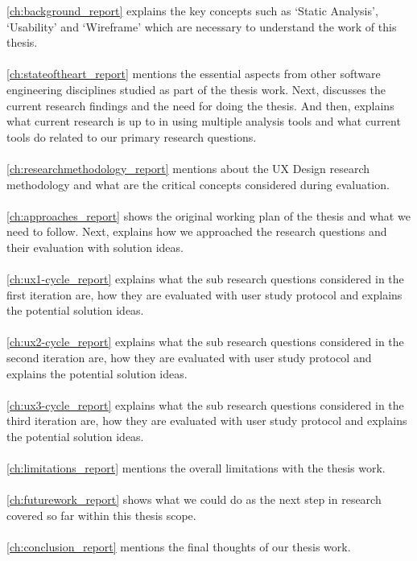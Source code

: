 \noindent \autoref{ch:background_report} explains the key concepts such as ‘Static Analysis’, ‘Usability’ and ‘Wireframe’ which are necessary to understand the work of this thesis. \\ \\
\autoref{ch:stateoftheart_report} mentions the essential aspects from other software engineering disciplines studied as part of the thesis work. Next, discusses the current research findings and the need for doing the thesis. And then, explains what current research is up to in using multiple analysis tools and what current tools do related to our primary research questions. \\ \\
\autoref{ch:researchmethodology_report} mentions about the UX Design research methodology and what are the critical concepts considered during evaluation. \\ \\
\autoref{ch:approaches_report} shows the original working plan of the thesis and what we need to follow. Next, explains how we approached the research questions and their evaluation with solution ideas. \\ \\
\autoref{ch:ux1-cycle_report} explains what the sub research questions considered in the first iteration are, how they are evaluated with user study protocol and explains the potential solution ideas. \\ \\
\autoref{ch:ux2-cycle_report} explains what the sub research questions considered in the second iteration are, how they are evaluated with user study protocol and explains the potential solution ideas. \\ \\
\autoref{ch:ux3-cycle_report} explains what the sub research questions considered in the third iteration are, how they are evaluated with user study protocol and explains the potential solution ideas. \\ \\
\autoref{ch:limitations_report} mentions the overall limitations with the thesis work. \\ \\
\autoref{ch:futurework_report} shows what we could do as the next step in research covered so far within this thesis scope. \\ \\
\autoref{ch:conclusion_report} mentions the final thoughts of our thesis work. \\ \\

\let\cleardoublepage\clearpage
